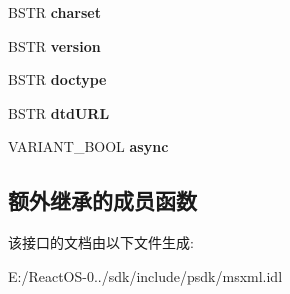 \begin{DoxyCompactItemize}
\mbox{\label{interface_m_s_x_m_l_1_1enum_ad273ca2d2bf85a058ad0f5d7a9d87cc5}} 
B\+S\+TR {\bfseries charset}
\item 
\mbox{\label{interface_m_s_x_m_l_1_1enum_ac85455850579e66797c9d6ae87f164da}} 
B\+S\+TR {\bfseries version}
\item 
\mbox{\label{interface_m_s_x_m_l_1_1enum_ad5dcf4b90bdc5eaaa0a77294ab1d085f}} 
B\+S\+TR {\bfseries doctype}
\item 
\mbox{\label{interface_m_s_x_m_l_1_1enum_a8d7882f5b542fad07f27d8d663e6f0c4}} 
B\+S\+TR {\bfseries dtd\+U\+RL}
\item 
\mbox{\label{interface_m_s_x_m_l_1_1enum_a949ede30b37f3dee082226035a93c1c4}} 
V\+A\+R\+I\+A\+N\+T\+\_\+\+B\+O\+OL {\bfseries async}
\end{DoxyCompactItemize}
\subsection*{额外继承的成员函数}


该接口的文档由以下文件生成\+:\begin{DoxyCompactItemize}
\item 
E\+:/\+React\+O\+S-\/0../sdk/include/psdk/msxml.\+idl\end{DoxyCompactItemize}
